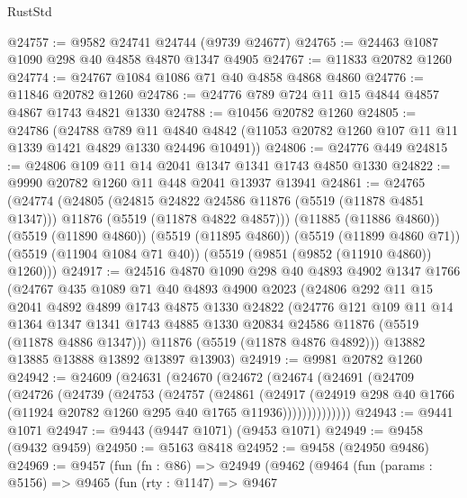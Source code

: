 \begin{lexlean}{RustStd}
\begin{coremodule}
@24757 := @9582 @24741 @24744 (@9739 @24677)
@24765 := @24463 @1087 @1090 @298 @40 @4858 @4870 @1347 @4905
@24767 := @11833 @20782 @1260
@24774 := @24767 @1084 @1086 @71 @40 @4858 @4868 @4860
@24776 := @11846 @20782 @1260
@24786 := @24776 @789 @724 @11 @15 @4844 @4857 @4867 @1743 @4821 @1330
@24788 := @10456 @20782 @1260
@24805 := @24786
    (@24788
      @789
      @11
      @4840
      @4842
      (@11053 @20782 @1260 @107 @11 @11 @1339 @1421 @4829 @1330 @24496 @10491))
@24806 := @24776 @449
@24815 := @24806 @109 @11 @14 @2041 @1347 @1341 @1743 @4850 @1330
@24822 := @9990 @20782 @1260 @11 @448 @2041 @13937 @13941
@24861 := @24765
    (@24774
      (@24805
        (@24815 @24822 @24586 @11876 (@5519 (@11878 @4851 @1347)))
        @11876
        (@5519 (@11878 @4822 @4857)))
      (@11885 (@11886 @4860))
      (@5519 (@11890 @4860))
      (@5519 (@11895 @4860))
      (@5519 (@11899 @4860 @71))
      (@5519 (@11904 @1084 @71 @40))
      (@5519 (@9851 (@9852 (@11910 @4860)) @1260)))
@24917 := @24516
    @4870
    @1090
    @298
    @40
    @4893
    @4902
    @1347
    @1766
    (@24767
      @435
      @1089
      @71
      @40
      @4893
      @4900
      @2023
      (@24806
        @292
        @11
        @15
        @2041
        @4892
        @4899
        @1743
        @4875
        @1330
        @24822
        (@24776
          @121
          @109
          @11
          @14
          @1364
          @1347
          @1341
          @1743
          @4885
          @1330
          @20834
          @24586
          @11876
          (@5519 (@11878 @4886 @1347)))
        @11876
        (@5519 (@11878 @4876 @4892)))
      @13882
      @13885
      @13888
      @13892
      @13897
      @13903)
@24919 := @9981 @20782 @1260
@24942 := @24609
    (@24631
      (@24670
        (@24672
          (@24674
            (@24691
              (@24709
                (@24726
                  (@24739
                    (@24753
                      (@24757
                        (@24861
                          (@24917
                            (@24919
                              @298
                              @40
                              @1766
                              (@11924 @20782 @1260 @295 @40 @1765 @11936))))))))))))))
@24943 := @9441 @1071
@24947 := @9443 (@9447 @1071) (@9453 @1071)
@24949 := @9458 (@9432 @9459)
@24950 := @5163 @8418
@24952 := @9458 (@24950 @9486)
@24969 := @9457
    (fun (fn : @86) =>
    @24949
      (@9462
        (@9464
          (fun (params : @5156) =>
          @9465
            (fun (rty : @1147) =>
            @9467

\end{coremodule}
\end{lexlean}
